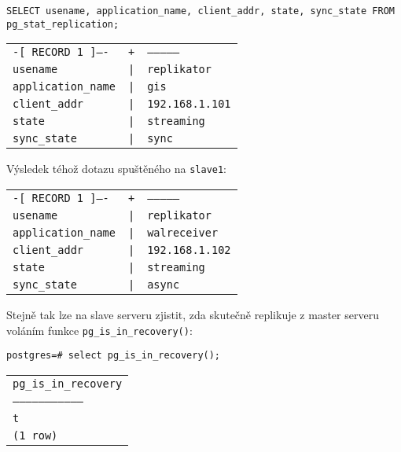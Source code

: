 \begin{lstlisting}
SELECT usename, application_name, client_addr, state, sync_state FROM pg_stat_replication;
\end{lstlisting}
\begin{table}[H]
  \label{pgHba}
  \begin{center}
    \begin{tabular}{lll}
      \texttt{-[ RECORD 1 ]----} & \texttt{+} & \texttt{--------------}\\
      \texttt{usename}           & \texttt{|} & \texttt{replikator}\\
      \texttt{application\_name} & \texttt{|} & \texttt{gis}\\
      \texttt{client\_addr}      & \texttt{|} & \texttt{192.168.1.101}\\
      \texttt{state}             & \texttt{|} & \texttt{streaming}\\
      \texttt{sync\_state}       & \texttt{|} & \texttt{sync}\\
    \end{tabular}
  \end{center}
\end{table}
Výsledek téhož dotazu spuštěného na \texttt{slave1}:
\begin{table}[H]
  \label{pgHba}
  \begin{center}
    \begin{tabular}{lll}
      \texttt{-[ RECORD 1 ]----} & \texttt{+} & \texttt{--------------}\\
      \texttt{usename}           & \texttt{|} & \texttt{replikator}\\
      \texttt{application\_name} & \texttt{|} & \texttt{walreceiver}\\
      \texttt{client\_addr}      & \texttt{|} & \texttt{192.168.1.102}\\
      \texttt{state}             & \texttt{|} & \texttt{streaming}\\
      \texttt{sync\_state}       & \texttt{|} & \texttt{async}\\
    \end{tabular}
  \end{center}
\end{table}

Stejně tak lze na slave serveru zjistit, zda skutečně replikuje z master serveru
voláním funkce \texttt{pg\_is\_in\_recovery()}:
\begin{lstlisting}
postgres=# select pg_is_in_recovery();
\end{lstlisting}
\begin{table}[H]
  \begin{center}
    \label{pgHba}
    \begin{tabular}{l}
      \texttt{pg\_is\_in\_recovery}\\
      \texttt{---------------------------------}\\
      \texttt{t}\\
      \texttt{(1 row)}\\
    \end{tabular}
  \end{center}
\end{table}


